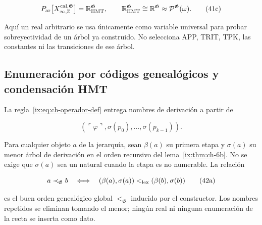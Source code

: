 \[
 P_{\rm ar}
 \bigl[X_{\infty,\mathbb Z}^{\rm cal,\mathfrak G}\bigr]
 =\mathbb R_{\rm HMT}^{\mathfrak G},
 \qquad
 \mathbb R_{\rm HMT}^{\mathfrak G}
 \cong\mathbb R^{\mathfrak G}
 \approx\mathcal P^{\mathfrak G}(\omega).
\tag{41c}\label{ix:eq:ch-recta-potencia}
\]

Aquí un real arbitrario se usa únicamente como variable universal para probar
sobreyectividad de un árbol ya construido. No selecciona APP, TRIT, TPK, las
constantes ni las transiciones de ese árbol.

\subsection{Enumeración por códigos genealógicos y condensación HMT}

La regla~\eqref{ix:eq:ch-operador-def} entrega nombres de derivación a partir de

\[
 (\ulcorner\varphi\urcorner,
  \sigma(p_0),\ldots,\sigma(p_{k-1})).
\tag{42}\label{ix:eq:ch-codigo-nombres}
\]

Para cualquier objeto \(a\) de la jerarquía, sean \(\beta(a)\) su primera
etapa y \(\sigma(a)\) su menor árbol de derivación en el orden recursivo del
lema~\ref{ix:thm:ch-6b}. No se exige que \(\sigma(a)\) sea un natural cuando la etapa es no
numerable. La relación

\[
 a\prec_{\mathfrak G}b
 \quad\Longleftrightarrow\quad
 (\beta(a),\sigma(a))<_{\rm lex}
 (\beta(b),\sigma(b))
\tag{42a}\label{ix:eq:ch-orden-genealogico}
\]

es el buen orden genealógico global \(<_{\mathfrak G}\) inducido por el
constructor. Los nombres repetidos se eliminan tomando el menor; ningún real
ni ninguna enumeración de la recta se inserta como dato.

